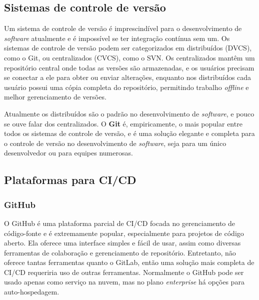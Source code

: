\subsection{Sistemas de controle de versão}\label{secao-vcs}
Um sistema de controle de versão é imprescindível para o desenvolvimento de \emph{software} atualmente e é impossível se ter integração contínua sem um. Os sistemas de controle de versão podem ser categorizados em distribuídos (DVCS), como o Git, ou centralizados (CVCS), como o SVN. Os centralizados mantêm um repositório central onde todas as versões são armazenadas, e os usuários precisam se conectar a ele para obter ou enviar alterações, enquanto nos distribuídos cada usuário possui uma cópia completa do repositório, permitindo trabalho \emph{offline} e melhor gerenciamento de versões. 

Atualmente os distribuídos são o padrão no desenvolvimento de \emph{software}, e pouco se ouve falar dos centralizados. O \textbf{Git} é, empiricamente, o mais popular entre todos os sistemas de controle de versão, e é uma solução elegante e completa para o controle de versão no desenvolvimento de \emph{software}, seja para um único desenvolvedor ou para equipes numerosas.

\subsection{Plataformas para CI/CD}

\subsubsection*{GitHub}
O GitHub é uma plataforma parcial de CI/CD focada no gerenciamento de código-fonte e é extremamente popular, especialmente para projetos de código aberto. Ela oferece uma interface simples e fácil de usar, assim como diversas ferramentas de colaboração e gerenciamento de repositório. Entretanto, não oferece tantas ferramentas quanto o GitLab, então uma solução mais completa de CI/CD requeriria uso de outras ferramentas. Normalmente o GitHub pode ser usado apenas como serviço na nuvem, mas no plano \emph{enterprise} há opções para auto-hospedagem.

